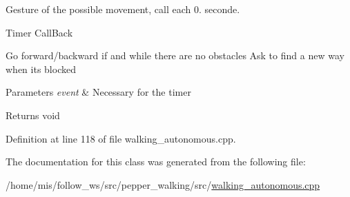 Gesture of the possible movement, call each 0. seconde. 

Timer Call\+Back

Go forward/backward if and while there are no obstacles Ask to find a new way when it\textquotesingle{}s blocked


\begin{DoxyParams}{Parameters}
{\em event} & Necessary for the timer \\
\hline
\end{DoxyParams}
\begin{DoxyReturn}{Returns}
void 
\end{DoxyReturn}


Definition at line 118 of file walking\+\_\+autonomous.\+cpp.



The documentation for this class was generated from the following file\+:\begin{DoxyCompactItemize}
\item 
/home/mis/follow\+\_\+ws/src/pepper\+\_\+walking/src/\hyperlink{walking__autonomous_8cpp}{walking\+\_\+autonomous.\+cpp}\end{DoxyCompactItemize}

